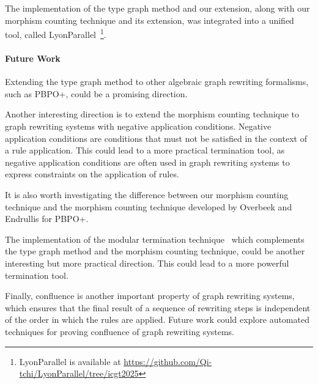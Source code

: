 \documentclass{report}
\begin{document}
The implementation of the type graph method and our extension, along with our morphism counting technique and its extension, was integrated into a unified tool, called LyonParallel~\footnote{LyonParallel is available at \url{https://github.com/Qi-tchi/LyonParallel/tree/icgt2025}}.
 
\paragraph{Future Work}

Extending the type graph method to other algebraic graph rewriting formalisms, such as PBPO+, could be a promising direction.

Another interesting direction is to extend the morphism counting technique to graph rewriting systems with negative application conditions. Negative application conditions are conditions that must not be satisfied in the context of a rule application. This could lead to a more practical termination tool, as negative application conditions are often used in graph rewriting systems to express constraints on the application of rules.

It is also worth investigating the difference between our morphism counting technique and
 the morphism counting technique developed by Overbeek and Endrullis for PBPO+. 
 
The implementation of the modular termination technique~\cite{plump2018modular} which complements the type graph method and the morphism counting technique, could be another interesting but more practical direction. This could lead to a more powerful termination tool.
  
Finally, confluence is another important property of graph rewriting systems, which ensures that the final result of a sequence of rewriting steps is independent of the order in which the rules are applied. Future work could explore automated techniques for proving confluence of graph rewriting systems.

\printbibliography
\end{document}
